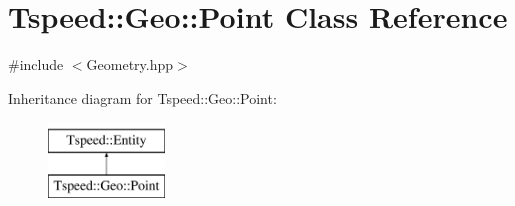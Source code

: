 \hypertarget{classTspeed_1_1Geo_1_1Point}{\section{Tspeed\-:\-:Geo\-:\-:Point Class Reference}
\label{classTspeed_1_1Geo_1_1Point}
}


{\ttfamily \#include $<$Geometry.\-hpp$>$}

Inheritance diagram for Tspeed\-:\-:Geo\-:\-:Point\-:\begin{figure}[H]
\begin{center}
\leavevmode
\includegraphics[height=2.000000cm]{classTspeed_1_1Geo_1_1Point}
\end{center}
\end{figure}
